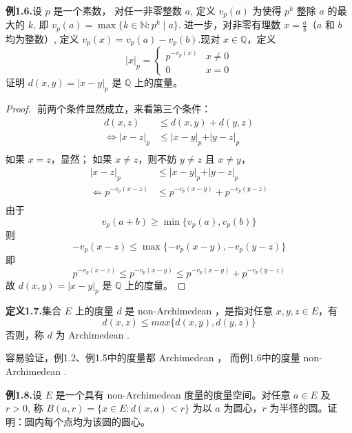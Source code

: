 \documentclass{article}
\begin{document}
\textbf{例1.6.}设 $p$ 是一个素数，
对任一非零整数 $a$,
定义 $v_p(a)$ 为使得 $p^k$ 整除 $a$ 的最大的 $k$,
即 $v_p(a) = \max\{k\in\mathbb{N}: p^k\mid a\}$.
进一步，对非零有理数 $x = \frac{a}{b}$（$a$ 和 $b$ 均为整数）,
定义 $v_p(x) = v_p(a) - v_p(b)$.现对 $x\in\mathbb{Q}$，定义
$$\vert x\vert_p = \begin{cases} p^{-v_p(x)} & x\neq 0 \\ 0 & x=0 \end{cases}$$
证明 $d(x,y) = \vert x-y\vert_p$ 是 $\mathbb{Q}$ 上的度量。

\begin{proof}
    $ $
    前两个条件显然成立，来看第三个条件：
    \begin{align*}
        d(x,z) &\leq d(x,y) + d(y,z) \\
        \iff \vert x-z\vert_p &\leq \vert x-y\vert_p + \vert y-z\vert_p \\
    \end{align*}
    如果 $x= z$，显然；
    如果 $x\neq z$，则不妨 $y\neq z$ 且 $x\neq y$，
    \begin{align*}
        \vert x-z\vert_p &\leq \vert x-y\vert_p + \vert y-z\vert_p \\
        \Longleftarrow p^{-v_p(x-z)} &\leq p^{-v_p(x-y)} + p^{-v_p(y-z)} \\
    \end{align*}
    由于
    \[v_p(a+b)\geq \min\{v_p(a),v_p(b)\}\]
    则
    \[-v_p(x-z)\leq \max\{-v_p(x-y),-v_p(y-z)\}\]
    即
    \[p^{-v_p(x-z)}\leq p^{-v_p(x-y)} \leq p^{-v_p(x-y)} + p^{-v_p(y-z)}\]
    故 $d(x,y) = \vert x-y\vert_p$ 是 $\mathbb{Q}$ 上的度量。
\end{proof}

\textbf{定义1.7.}集合 $E$ 上的度量 $d$ 是 non-Archimedean ，是指对任意 $x,y,z\in E$，有
$$d(x,z) \leq max\{d(x,y),d(y,z)\}$$
否则，称 $d$ 为 Archimedean .

容易验证，例1.2、例1.5中的度量都 Archimedean ，
而例1.6中的度量 non-Archimedean .

\textbf{例1.8.}设 $E$ 是一个具有 non-Archimedean 度量的度量空间。对任意 $a\in E$ 及 $r>0$,
称 $B(a,r) = \{x\in E: d(x,a)<r\}$ 为以 $a$ 为圆心，$r$ 为半径的圆。证明：圆内每个点均为该圆的圆心。
\end{document}
